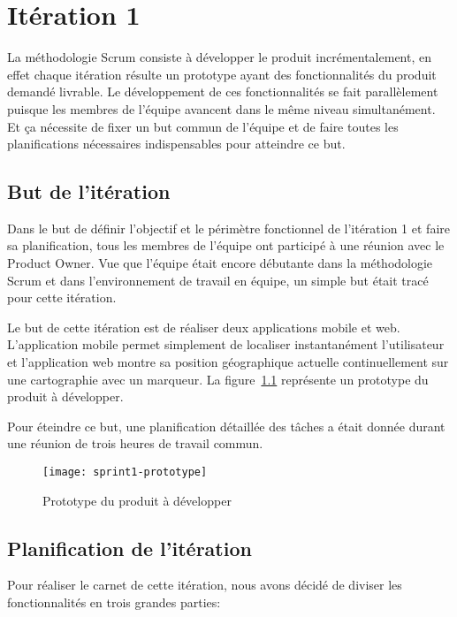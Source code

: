 \chapter{Itération 1}

La méthodologie Scrum consiste à développer le produit incrémentalement, en
effet chaque itération résulte un prototype ayant des fonctionnalités du
produit demandé livrable. Le développement de ces fonctionnalités se fait
parallèlement puisque les membres de l'équipe avancent dans le même niveau
simultanément. Et ça nécessite de fixer un but commun de l'équipe et de faire
toutes les planifications nécessaires indispensables pour atteindre ce but.

\section{But de l'itération}

Dans le but de définir l'objectif et le périmètre fonctionnel de l'itération 1
et faire sa planification, tous les membres de l'équipe ont participé à une
réunion avec le Product Owner. Vue que l'équipe était encore débutante dans la
méthodologie Scrum et dans l'environnement de travail en équipe, un simple but
était tracé pour cette itération.

Le but de cette itération est de réaliser deux applications mobile et web.
L'application mobile permet simplement de localiser instantanément
l'utilisateur et l'application web montre sa position géographique actuelle
continuellement sur une cartographie avec un marqueur. La
figure~\ref{fig:sprint1-prototype} représente un prototype du produit à
développer.

Pour éteindre ce but, une planification détaillée des tâches a était donnée
durant une réunion de trois heures de travail commun.

\begin{figure}[H]
    \centering
    \texttt{[image: sprint1-prototype]}
    \caption{Prototype du produit à développer}
\label{fig:sprint1-prototype}
\end{figure}

\section{Planification de l'itération}

Pour réaliser le carnet de cette itération, nous avons décidé de diviser les
fonctionnalités en trois grandes parties:

